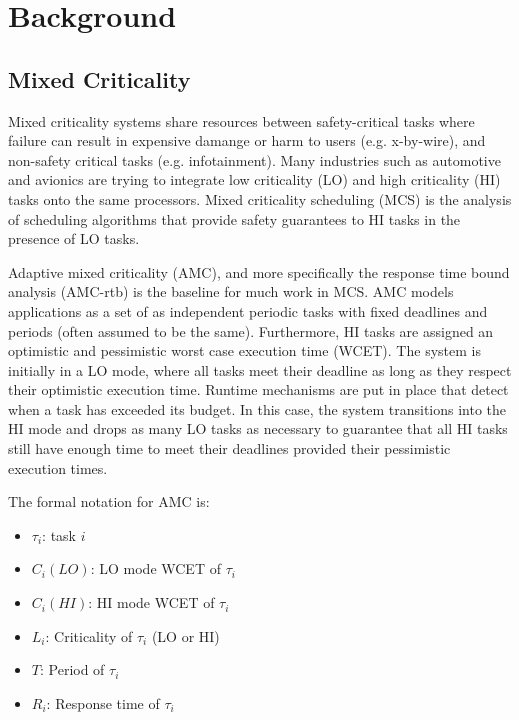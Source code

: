 
\chapter{Background} %

\label{c:background} %


\section{Mixed Criticality}
\label{s:mixedcriticality}
	Mixed criticality systems share resources between safety-critical tasks where failure can result in expensive damange or harm to users (e.g. x-by-wire), and non-safety critical tasks (e.g. infotainment). 
	Many industries such as automotive and avionics are trying to integrate low criticality (LO) and high criticality (HI) tasks onto the same processors.
	Mixed criticality scheduling (MCS) is the analysis of scheduling algorithms that provide safety guarantees to HI tasks in the presence of LO tasks.
	
	Adaptive mixed criticality (AMC), and more specifically the response time bound analysis (AMC-rtb) \cite{baruah2011response} is the baseline for much work in MCS. 
	AMC models applications as a set of as independent periodic tasks with fixed deadlines and periods (often assumed to be the same).
	Furthermore, HI tasks are assigned an optimistic and pessimistic worst case execution time (WCET). 
	The system is initially in a LO mode, where all tasks meet their deadline as long as they respect their optimistic execution time.
	Runtime mechanisms are put in place that detect when a task has exceeded its budget.
	In this case, the system transitions into the HI mode and drops as many LO tasks as necessary to guarantee that all HI tasks still have enough time to meet their deadlines provided their pessimistic execution times. 
	
	The formal notation for AMC is:
	\begin{itemize}
	  \item $\tau_i$: task $i$
	  \item $C_i(LO)$: LO mode WCET of $\tau_i$
	  \item $C_i(HI)$: HI mode WCET of $\tau_i$
	  \item $L_i$: Criticality of $\tau_i$ (LO or HI)
	  \item $T$: Period of $\tau_i$
	  \item $R_i$: Response time of $\tau_i$
	\end{itemize}

